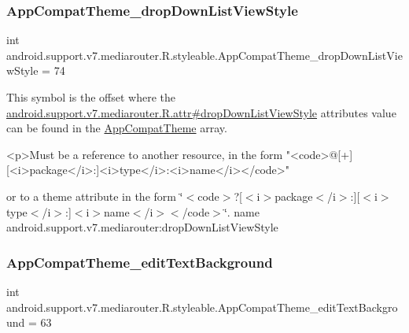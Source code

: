 \subsubsection{\texorpdfstring{App\+Compat\+Theme\+\_\+drop\+Down\+List\+View\+Style}{AppCompatTheme\_dropDownListViewStyle}}
{\footnotesize\ttfamily int android.\+support.\+v7.\+mediarouter.\+R.\+styleable.\+App\+Compat\+Theme\+\_\+drop\+Down\+List\+View\+Style = 74\hspace{0.3cm}{\ttfamily [static]}}

This symbol is the offset where the \hyperlink{classandroid_1_1support_1_1v7_1_1mediarouter_1_1R_1_1attr_a6f8a3a2e0500edd730fb01e396a74907}{android.\+support.\+v7.\+mediarouter.\+R.\+attr\#drop\+Down\+List\+View\+Style} attribute\textquotesingle{}s value can be found in the \hyperlink{classandroid_1_1support_1_1v7_1_1mediarouter_1_1R_1_1styleable_a4e3d3900c75d49aeb2f283cac00214d6}{App\+Compat\+Theme} array.

\begin{DoxyVerb}      <p>Must be a reference to another resource, in the form "<code>@[+][<i>package</i>:]<i>type</i>:<i>name</i></code>"
\end{DoxyVerb}
 or to a theme attribute in the form \char`\"{}$<$code$>$?\mbox{[}$<$i$>$package$<$/i$>$\+:\mbox{]}\mbox{[}$<$i$>$type$<$/i$>$\+:\mbox{]}$<$i$>$name$<$/i$>$$<$/code$>$\char`\"{}.  name android.\+support.\+v7.\+mediarouter\+:drop\+Down\+List\+View\+Style \mbox{\label{classandroid_1_1support_1_1v7_1_1mediarouter_1_1R_1_1styleable_a6fda1fd04dd1db6ea57c92f5116e4ccb}} 
\subsubsection{\texorpdfstring{App\+Compat\+Theme\+\_\+edit\+Text\+Background}{AppCompatTheme\_editTextBackground}}
{\footnotesize\ttfamily int android.\+support.\+v7.\+mediarouter.\+R.\+styleable.\+App\+Compat\+Theme\+\_\+edit\+Text\+Background = 63\hspace{0.3cm}{\ttfamily [static]}}

